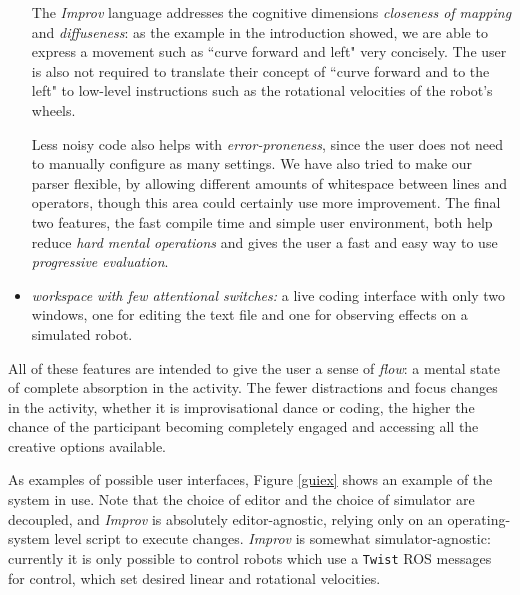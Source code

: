 \documentclass[sigchi-a]{acmart}
\begin{document}
\begin{itemize}
\begin{sidebar}
The \emph{Improv} language addresses the cognitive
dimensions \emph{closeness of mapping} and \emph{diffuseness}: as the example in the introduction showed, we
are able to express a movement such as ``curve forward and left" very concisely. The user is also not required to translate their
concept of ``curve forward and to the left" to low-level instructions such as the 
rotational velocities of the robot's wheels.

Less noisy code also
helps with \emph{error-proneness}, since the user does not need to manually
configure as many settings. We have also tried to make our parser flexible, by
allowing different amounts of whitespace between lines and operators, though
this area could certainly use more improvement. The final two features, the fast
compile time and simple user environment, both help reduce \emph{hard mental
operations} and gives the user a fast and easy way to use \emph{progressive
evaluation}.
\end{sidebar}

\item \emph{workspace with few attentional switches:}
a live coding interface with only two windows, one for editing the text file and
one for observing effects on a simulated robot.
\end{itemize}


All of these features are intended to give the user a sense of \emph{flow}: a
mental state of complete absorption in the activity. The fewer distractions and
focus changes in the activity, whether it is improvisational dance or coding,
the higher the chance of the participant becoming completely engaged and
accessing all the creative options available.

As examples of possible user interfaces, Figure \ref{guiex} shows an example of 
the system in use. Note that the choice of
editor and the choice of simulator are decoupled, and \emph{Improv} is
absolutely editor-agnostic, relying only on an operating-system level script
to execute changes. \emph{Improv} is somewhat simulator-agnostic: 
currently it is only possible to control robots which use a \texttt{Twist} ROS messages
for control, which set desired linear and rotational
velocities.
\end{document}
